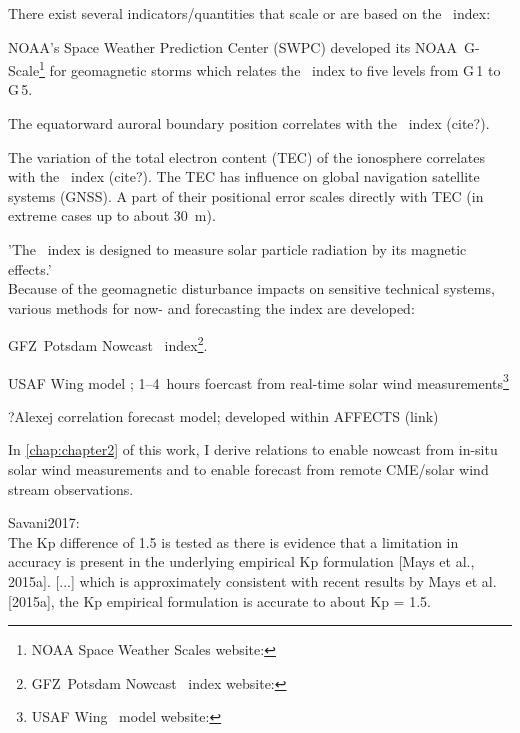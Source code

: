 There exist several indicators/quantities that scale or are based on the \Kp{}~index:
\begin{itemize*}
	\item NOAA's Space Weather Prediction Center (SWPC) developed its NOAA~G-Scale\footnote{NOAA Space Weather Scales website: } for geomagnetic storms which relates the \Kp~index to five levels from G\,1 to G\,5.
	\item The equatorward auroral boundary position correlates with the \Kp~index (cite?).
	\item The variation of the total electron content (TEC) of the ionosphere correlates with the \Kp~index (cite?). The TEC has influence on global navigation satellite systems (GNSS). A part of their positional error scales directly with TEC (in extreme cases up to about \SI{30}{\m}).
\end{itemize*}


'The \Kp{}~index is designed to measure solar particle radiation by its magnetic effects.'\\

Because of the geomagnetic disturbance impacts on sensitive technical systems, various methods for now- and forecasting the \Kp{} index are developed:
\begin{itemize*}
	\item GFZ~Potsdam Nowcast \Kp~index\footnote{GFZ~Potsdam Nowcast \Kp~index website: }.
	\item USAF Wing \Kp{} model \citep{Wing2005}; 1--4~hours foercast from real-time solar wind measurements\footnote{USAF Wing \Kp~model website: }
	\item ?Alexej \Kp{} correlation forecast model; developed within AFFECTS (link)
	\item In \autoref{chap:chapter2} of this work, I derive relations to enable \Kp{} nowcast from in-situ solar wind measurements and to enable \Kp{} forecast from remote CME/solar wind stream observations.
\end{itemize*}


Savani2017:\\
The Kp difference of 1.5 is tested as there is evidence that a limitation in accuracy is present in the underlying empirical Kp formulation [Mays et al., 2015a]. [...] which is approximately consistent with recent results by Mays et al. [2015a], the Kp empirical formulation is accurate to about Kp = 1.5.\\


